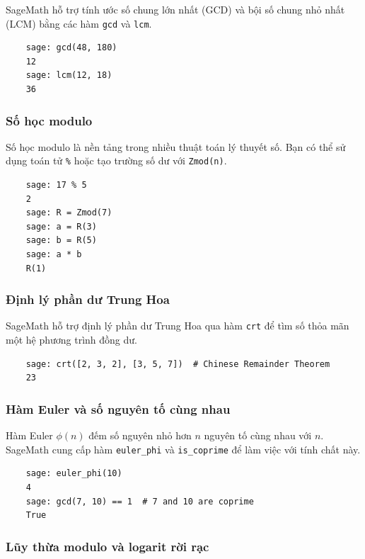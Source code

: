 SageMath hỗ trợ tính ước số chung lớn nhất (GCD) và bội số chung nhỏ nhất (LCM) bằng các hàm \texttt{gcd} và \texttt{lcm}.

\begin{lstlisting}
	sage: gcd(48, 180)
	12
	sage: lcm(12, 18)
	36
\end{lstlisting}

\subsubsection{Số học modulo}

Số học modulo là nền tảng trong nhiều thuật toán lý thuyết số. Bạn có thể sử dụng toán tử \texttt{\%} hoặc tạo trường số dư với \texttt{Zmod(n)}.

\begin{lstlisting}
	sage: 17 % 5
	2
	sage: R = Zmod(7)
	sage: a = R(3)
	sage: b = R(5)
	sage: a * b
	R(1)
\end{lstlisting}

\subsubsection{Định lý phần dư Trung Hoa}

SageMath hỗ trợ định lý phần dư Trung Hoa qua hàm \texttt{crt} để tìm số thỏa mãn một hệ phương trình đồng dư.

\begin{lstlisting}
	sage: crt([2, 3, 2], [3, 5, 7])  # Chinese Remainder Theorem
	23
\end{lstlisting}

\subsubsection{Hàm Euler và số nguyên tố cùng nhau}

Hàm Euler \(\phi(n)\) đếm số nguyên nhỏ hơn \(n\) nguyên tố cùng nhau với \(n\). SageMath cung cấp hàm \texttt{euler\_phi} và \texttt{is\_coprime} để làm việc với tính chất này.

\begin{lstlisting}
	sage: euler_phi(10)
	4
	sage: gcd(7, 10) == 1  # 7 and 10 are coprime
	True
\end{lstlisting}

\subsubsection{Lũy thừa modulo và logarit rời rạc}

